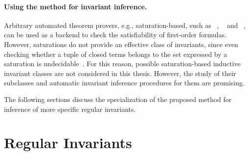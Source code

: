 \paragraph{Using the method for invariant inference.}
Arbitrary automated theorem provers, e.g., saturation-based, such as \vampire{}~\cite{kovacs2013first}, \eprover{}~\cite{10.5555/1218615.1218621} and \zipperposition{}~\cite{10.1007/978-3-319-66167-4_10}, can be used as a backend to check the satisfiability of first-order formulas.
However, saturations do not provide an effective class of invariants, since even checking whether a tuple of closed terms belongs to the set expressed by a saturation is undecidable~\cite{4556689}.
For this reason, possible saturation-based inductive invariant classes are not considered in this thesis. However, the study of their subclasses and automatic invariant inference procedures for them are promising.

The following sections discuss the specialization of the proposed method for inference of more specific regular invariants.

\section{Regular Invariants}\label{sec:fmf/regular}

